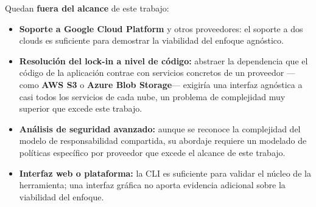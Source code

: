 Quedan \textbf{fuera del alcance} de este trabajo:

\begin{itemize}
    \item \textbf{Soporte a Google Cloud Platform} y otros proveedores: el soporte
    a dos clouds es suficiente para demostrar la viabilidad del enfoque agnóstico.

    \item \textbf{Resolución del lock-in a nivel de código:} abstraer la dependencia que el
    código de la aplicación contrae con servicios concretos de un proveedor —como
    \textbf{AWS S3} o \textbf{Azure Blob Storage}— exigiría una interfaz agnóstica a casi
    todos los servicios de cada nube, un problema de complejidad muy superior que excede
    este trabajo.

    \item \textbf{Análisis de seguridad avanzado:} aunque se reconoce la
    complejidad del modelo de responsabilidad compartida, su abordaje requiere
    un modelado de políticas específico por proveedor que excede el alcance de
    este trabajo.

    \item \textbf{Interfaz web o plataforma:} la CLI es suficiente para validar
    el núcleo de la herramienta; una interfaz gráfica no aporta evidencia adicional
    sobre la viabilidad del enfoque.
\end{itemize}
